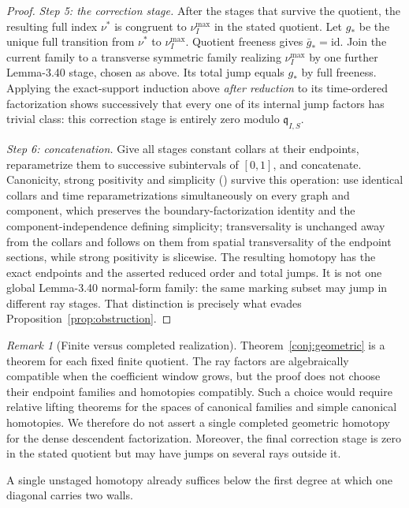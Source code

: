 \documentclass[11pt]{amsart}
\theoremstyle{definition}
\theoremstyle{remark}
\newtheorem{remark}[theorem]{Remark}
\begin{document}
\begin{proof}
\emph{Step 5: the correction stage.}
After the stages that survive the quotient, the resulting full index $\nu^*$ is congruent to
$\nu_I^{\max}$ in the stated quotient. Let $g_{*}$ be the unique full transition from
$\nu^*$ to $\nu_I^{\max}$. Quotient freeness gives $\bar g_{*}=\mathrm{id}$. Join
the current family to a transverse symmetric family realizing $\nu_I^{\max}$ by
one further Lemma-3.40 stage, chosen as above. Its total jump equals $g_{*}$ by full
freeness. Applying the exact-support induction above \emph{after reduction} to
its time-ordered factorization shows successively that every one of its
internal jump factors has trivial class: this correction stage is entirely
zero modulo $\mathfrak q_{I,S}$.

\emph{Step 6: concatenation.}
Give all stages constant collars at their endpoints, reparametrize them to
successive subintervals of $[0,1]$, and concatenate. Canonicity, strong
positivity and simplicity (\cite[Defs.~3.18, 3.22, 3.36--3.37]{GKT}) survive
this operation: use identical collars and
time reparametrizations simultaneously on every graph and component, which
preserves the boundary-factorization identity \cite[(3.12)]{GKT} and the
component-independence defining simplicity; transversality is unchanged away
from the collars and follows on them from spatial transversality of the
endpoint sections, while strong positivity is slicewise.
The resulting homotopy has the exact endpoints and the asserted reduced order
and total jumps. It is not one global Lemma-3.40 normal-form family: the same
marking subset may jump in different ray stages. That distinction is precisely
what evades Proposition~\ref{prop:obstruction}.

\end{proof}

\begin{remark}[Finite versus completed realization]
Theorem~\ref{conj:geometric} is a theorem for each fixed finite quotient.  The
ray factors are algebraically compatible when the coefficient window grows,
but the proof does not choose their endpoint families and homotopies
compatibly.  Such a choice would require relative lifting theorems for the
spaces of canonical families and simple canonical homotopies.  We therefore
do not assert a single completed geometric homotopy for the dense descendent
factorization.  Moreover, the final correction stage is zero in the stated
quotient but may have jumps on several rays outside it.
\end{remark}

A single unstaged homotopy already suffices below the first degree at which one
diagonal carries two walls.
\end{document}
